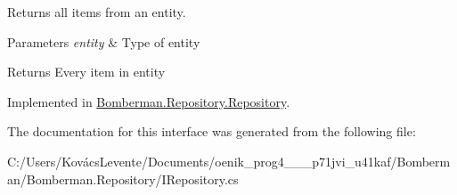 Returns all items from an entity. 


\begin{DoxyParams}{Parameters}
{\em entity} & Type of entity\\
\hline
\end{DoxyParams}
\begin{DoxyReturn}{Returns}
Every item in entity
\end{DoxyReturn}


Implemented in \mbox{\hyperlink{class_bomberman_1_1_repository_1_1_repository_a3853a77eda150ba9389082a7315413f1}{Bomberman.\+Repository.\+Repository}}.



The documentation for this interface was generated from the following file\+:\begin{DoxyCompactItemize}
\item 
C\+:/\+Users/\+Kovács\+Levente/\+Documents/oenik\+\_\+prog4\+\_\+\_\+\_\+p71jvi\+\_\+u41kaf/\+Bomberman/\+Bomberman.\+Repository/I\+Repository.\+cs\end{DoxyCompactItemize}
